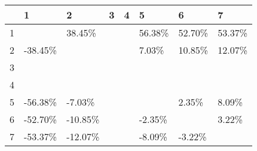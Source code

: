 \begin{table}[ht]
\centering
\begin{tabular}{rlllllll}
  \hline
 & 1 & 2 & 3 & 4 & 5 & 6 & 7 \\ 
  \hline
1 &  & 38.45\% &  &  & 56.38\% & 52.70\% & 53.37\% \\ 
  2 & -38.45\% &  &  &  & 7.03\% & 10.85\% & 12.07\% \\ 
  3 &  &  &  &  &  &  &  \\ 
  4 &  &  &  &  &  &  &  \\ 
  5 & -56.38\% & -7.03\% &  &  &  & 2.35\% & 8.09\% \\ 
  6 & -52.70\% & -10.85\% &  &  & -2.35\% &  & 3.22\% \\ 
  7 & -53.37\% & -12.07\% &  &  & -8.09\% & -3.22\% &  \\ 
   \hline
\end{tabular}
\end{table}
